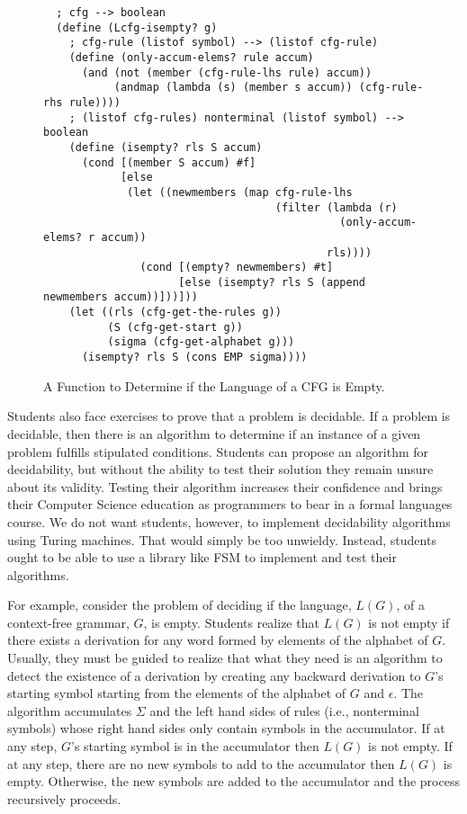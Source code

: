 \documentclass{eptcs}
\begin{document}
\begin{figure}
\begin{verbatim}
  ; cfg --> boolean
  (define (Lcfg-isempty? g)
    ; cfg-rule (listof symbol) --> (listof cfg-rule)
    (define (only-accum-elems? rule accum)
      (and (not (member (cfg-rule-lhs rule) accum))
           (andmap (lambda (s) (member s accum)) (cfg-rule-rhs rule))))
    ; (listof cfg-rules) nonterminal (listof symbol) --> boolean
    (define (isempty? rls S accum)
      (cond [(member S accum) #f]
            [else
             (let ((newmembers (map cfg-rule-lhs
                                    (filter (lambda (r)
                                              (only-accum-elems? r accum))
                                            rls))))
               (cond [(empty? newmembers) #t]
                     [else (isempty? rls S (append newmembers accum))]))]))
    (let ((rls (cfg-get-the-rules g))
          (S (cfg-get-start g))
          (sigma (cfg-get-alphabet g)))
      (isempty? rls S (cons EMP sigma))))
\end{verbatim}
\caption{A Function to Determine if the Language of a CFG is Empty.}
\label{cfge}
\end{figure}

Students also face exercises to prove that a problem is decidable. If a problem is decidable, then there is an algorithm to determine if an instance of a given problem fulfills stipulated conditions. Students can propose an algorithm for decidability, but without the ability to test their solution they remain unsure about its validity. Testing their algorithm increases their confidence and brings their Computer Science education as programmers to bear in a formal languages course. We do not want students, however, to implement decidability algorithms using Turing machines. That would simply be too unwieldy. Instead, students ought to be able to use a library like \textsf{FSM} to implement and test their algorithms.

For example, consider the problem of deciding if the language, $L(G)$, of a context-free grammar, $G$, is empty. Students realize that $L(G)$ is not empty if there exists a derivation for any word formed by elements of the alphabet of $G$. Usually, they must be guided to realize that what they need is an algorithm to detect the existence of a derivation by creating any backward derivation to $G$'s starting symbol starting from the elements of the alphabet of $G$ and $\epsilon$. The algorithm accumulates $\Sigma$ and the left hand sides of rules (i.e., nonterminal symbols) whose right hand sides only contain symbols in the accumulator. If at any step, $G$'s starting symbol is in the accumulator then $L(G)$ is not empty. If at any step, there are no new symbols to add to the accumulator then $L(G)$ is empty. Otherwise, the new symbols are added to the accumulator and the process recursively proceeds.
\end{document}
